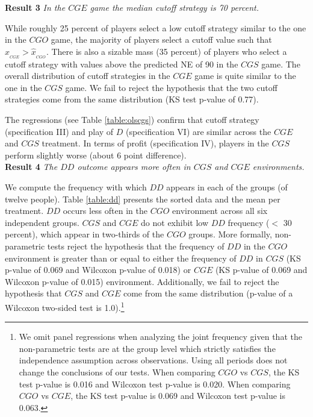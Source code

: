 \documentclass[12pt,english]{article}
\begin{document}
\noindent \textbf{Result 3}
\textit{In the $CGE$ game the median cutoff strategy is 70 percent.}

While roughly 25 percent of players select a low cutoff strategy similar to the one in the $CGO$ game, the majority of players select a cutoff value such that $\hat{x}_{_{CGE}}> \hat{x}_{_{CGO}}$. There is also a sizable mass (35 percent) of players who select a cutoff strategy with values above the predicted NE of 90 in the $CGS$ game. The overall distribution of cutoff strategies in the $CGE$ game is quite similar to the one in the $CGS$ game. We fail to reject the hypothesis that the two cutoff strategies come from the same distribution (KS test p-value of 0.77).

The regressions (see Table \ref{table:olscgs}) confirm that cutoff strategy (specification III) and play of $D$ (specification VI) are similar across the $CGE$ and $CGS$ treatment. In terms of profit (specification IV), players in the $CGS$ perform slightly worse (about 6 point difference).\\

\noindent \textbf{Result 4}
\textit{The $DD$ outcome appears more often in $CGS$ and $CGE$ environments.}

We compute the frequency with which $DD$ appears in each of the groups (of twelve people). Table \ref{table:dd} presents the sorted data and the mean per treatment. $DD$ occurs less often in the $CGO$ environment across all six independent groups. $CGS$ and $CGE$ do not exhibit low $DD$ frequency ($<$ 30 percent), which appear in two-thirds of the $CGO$ groups. More formally, non-parametric tests reject the hypothesis that the frequency of $DD$ in the $CGO$ environment is greater than or equal to either the frequency of $DD$ in $CGS$ (KS p-value of 0.069 and Wilcoxon p-value of 0.018) or $CGE$ (KS p-value of 0.069 and Wilcoxon p-value of 0.015) environment. Additionally, we fail to reject the hypothesis that $CGS$ and $CGE$ come from the same distribution (p-value of a Wilcoxon two-sided test is 1.0).\footnote{We omit panel regressions when analyzing the joint frequency given that the non-parametric tests are at the group level which strictly satisfies the independence assumption across observations. Using all periods does not change the conclusions of our tests. When comparing $CGO$ vs $CGS$, the KS test p-value is 0.016 and Wilcoxon test p-value is 0.020. When comparing $CGO$ vs $CGE$, the KS test p-value is 0.069 and Wilcoxon test p-value is 0.063. }\\
\end{document}
